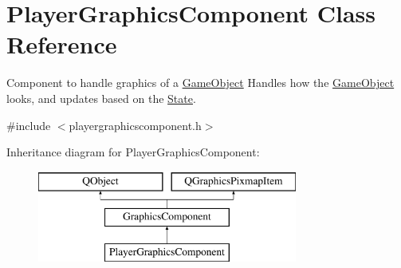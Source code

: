 \hypertarget{classPlayerGraphicsComponent}{\section{Player\-Graphics\-Component Class Reference}
\label{classPlayerGraphicsComponent}
}


Component to handle graphics of a \hyperlink{classGameObject}{Game\-Object} Handles how the \hyperlink{classGameObject}{Game\-Object} looks, and updates based on the \hyperlink{classState}{State}.  




{\ttfamily \#include $<$playergraphicscomponent.\-h$>$}

Inheritance diagram for Player\-Graphics\-Component\-:\begin{figure}[H]
\begin{center}
\leavevmode
\includegraphics[height=3.000000cm]{classPlayerGraphicsComponent}
\end{center}
\end{figure}
